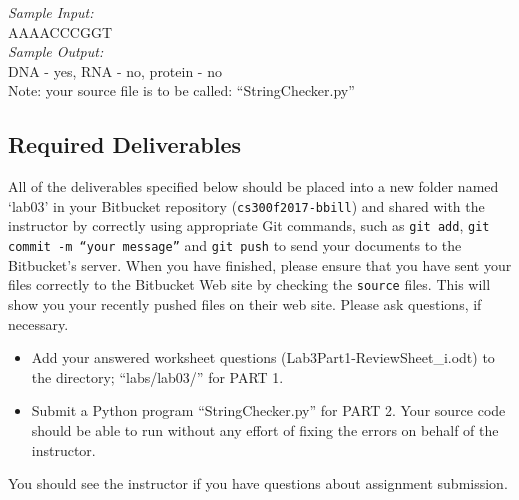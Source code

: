 \noindent \emph{Sample Input: } \\
\noindent AAAACCCGGT \\
\emph{Sample Output: } \\
DNA - yes, RNA - no, protein - no\\
\noindent
Note: your source file is to be called: ``StringChecker.py''


\vspace*{-.2in}
\subsection*{Required Deliverables}
\vspace*{-.1in}
All of the deliverables specified below should be placed into a new folder named `lab03' in your Bitbucket repository ({\tt cs300f2017-bbill})  and shared with the instructor by correctly using  appropriate Git commands, such as {\tt git add}, {\tt git commit -m ``your message''} and {\tt git push} to send your documents to the Bitbucket's server. When you have finished, please ensure that you have sent your files correctly to the Bitbucket Web site by checking the {\tt source} files. This will show you your recently pushed files on their web site. Please ask questions, if necessary.
\color{red}

\begin{itemize}
	\item Add your answered worksheet questions (Lab3Part1-ReviewSheet\_i.odt) to the directory; ``labs/lab03/'' for PART 1.
	\item Submit a Python program ``StringChecker.py'' for PART 2. Your source code should be able to run without any effort of fixing the errors on behalf of the instructor.
\end{itemize}
\color{black}

\noindent You should see the instructor if you have questions about assignment submission.

